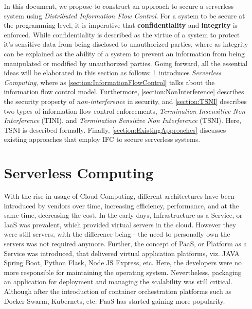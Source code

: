 In this document, we propose to construct an approach to secure a serverless system using \textit{Distributed Information Flow Control}. For a system to be secure at the programming level, it is imperative that \textbf{confidentiality} and \textbf{integrity} is enforced. While confidentiality is described as the virtue of a system to protect it's sensitive data from being disclosed to unauthorized parties, where as integrity can be explained as the ability of a system to prevent an information from being manipulated or modified by unauthorized parties. Going forward, all the essential ideas will be elaborated in this section as follows: \ref{section:ServerlessComputing} introduces \textit{Serverless Computing}, where as \ref{section:InformationFlowControl} talks about the information flow control model. Furthermore, \ref{section:NonInterference} describes the security property of \textit{non-interference} in security, and \ref{section:TSNI} describes two types of information flow control enforcements, \textit{Termination Insensitive Non Interference} (TINI), and \textit{Termination Sensitive Non Interference} (TSNI). Here, TSNI is described formally. Finally, \ref{section:ExistingApproaches} discusses existing approaches that employ IFC to secure serverless systems.

\section{Serverless Computing}
\label{section:ServerlessComputing}
With the rise in usage of Cloud Computing, different architectures have been introduced by vendors over time, increasing efficiency, performance, and at the same time, decreasing the cost. In the early days, Infrastructure as a Service, or IaaS was prevalent, which provided virtual servers in the cloud. However they were still servers, with the difference being - the need to personally own the servers was not required anymore. Further, the concept of PaaS, or Platform as a Service was introduced, that delivered virtual application platforms, viz. JAVA Spring Boot, Python Flask, Node JS Express, etc. Here, the developers were no more responsible for maintaining the operating system. Nevertheless, packaging an application for deployment and  managing the scalability was still critical. Although after the introduction of container orchestration platforms such as Docker Swarm, Kubernets, etc. PaaS has started gaining more popularity.


